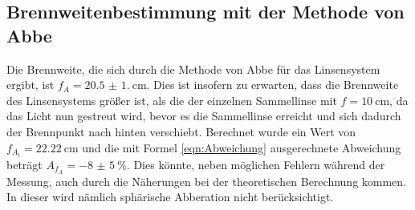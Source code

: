 \subsection{Brennweitenbestimmung mit der Methode von Abbe}
Die Brennweite, die sich durch die Methode von Abbe für das Linsensystem ergibt, ist $f_A=\qty{20.5(1.0)}{\centi\meter}$.
Dies ist insofern zu erwarten, dass die Brennweite des Linsensystems größer ist, als die der einzelnen Sammellinse mit $f=\qty{10}{\centi\meter}$,
da das Licht nun gestreut wird, bevor es die Sammellinse erreicht und sich dadurch der Brennpunkt nach hinten verschiebt.
Berechnet wurde ein Wert von $f_{A_t}=\qty{22.22}{\centi\meter}$ und die mit Formel \ref{eqn:Abweichung} ausgerechnete Abweichung beträgt $A_{f_A}=\qty{-8(5)}{\percent}$.
Dies könnte, neben möglichen Fehlern während der Messung, auch durch die Näherungen bei der theoretischen Berechnung kommen.
In dieser wird nämlich sphärische Abberation nicht berücksichtigt.
